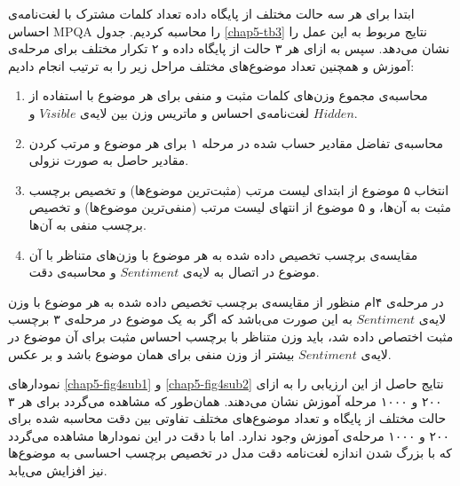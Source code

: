 ابتدا برای هر سه‌ حالت مختلف از پایگاه داده تعداد کلمات مشترک با لغت‌نامه‌ی احساس
MPQA
را محاسبه کردیم. جدول
\ref{chap5-tb3}
نتایج مربوط به این عمل را نشان می‌‌دهد. سپس به ازای هر ۳ حالت از پایگاه داده و ۲ تکرار مختلف برای مرحله‌ی آموزش و همچنین تعداد موضوع‌های مختلف مراحل زیر را به ترتیب انجام دادیم:
\begin{enumerate}
	\item محاسبه‌ی مجموع وزن‌های کلمات مثبت و منفی‌ برای هر موضوع با استفاده از لغت‌نامه‌ی احساس و ماتریس وزن بین لایه‌ی $Visible$ و $Hidden$. 
	\item محاسبه‌ی تفاضل مقادیر حساب شده در مرحله ۱ برای هر موضوع و مرتب کردن مقادیر حاصل به صورت نزولی.
	\item انتخاب ۵ موضوع از ابتدای لیست مرتب (مثبت‌ترین موضوع‌ها) و تخصیص برچسب مثبت به آن‌ها، و ۵ موضوع از انتهای لیست مرتب (منفی‌ترین موضوع‌ها) و تخصیص برچسب منفی‌ به آن‌ها.
	\item مقایسه‌ی برچسب تخصیص داده شده به هر موضوع با وزن‌های متناظر با آن موضوع در اتصال به لایه‌ی
	$Sentiment$
	و محاسبه‌ی دقت.
\end{enumerate}

در مرحله‌ی ۴ام منظور از مقایسه‌ی برچسب تخصیص داده شده به هر موضوع با وزن لایه‌ی
$Sentiment$
به این صورت می‌‌باشد که اگر به یک موضوع در مرحله‌ی ۳ برچسب مثبت اختصاص داده شد، باید وزن متناظر با برچسب احساس مثبت برای آن موضوع در لایه‌ی
$Sentiment$
بیشتر از وزن منفی‌ برای همان موضوع باشد و بر عکس.

نمودار‌های
\ref{chap5-fig4sub1}
و
\ref{chap5-fig4sub2}
نتایج حاصل از این ارزیابی را به ازای ۲۰۰ و ۱۰۰۰ مرحله آموزش نشان می‌‌دهند. همان‌طور که مشاهده می‌‌گردد برای هر ۳ حالت مختلف از پایگاه و تعداد موضوع‌های مختلف تفاوتی‌ بین دقت محاسبه شده برای ۲۰۰ و ۱۰۰۰ مرحله‌‌ی آموزش وجود ندارد. اما با دقت در این نمودارها مشاهده می‌‌گردد که با بزرگ شدن اندازه لغت‌نامه دقت مدل در تخصیص برچسب احساسی‌ به موضوع‌ها نیز افزایش می‌‌یابد.

